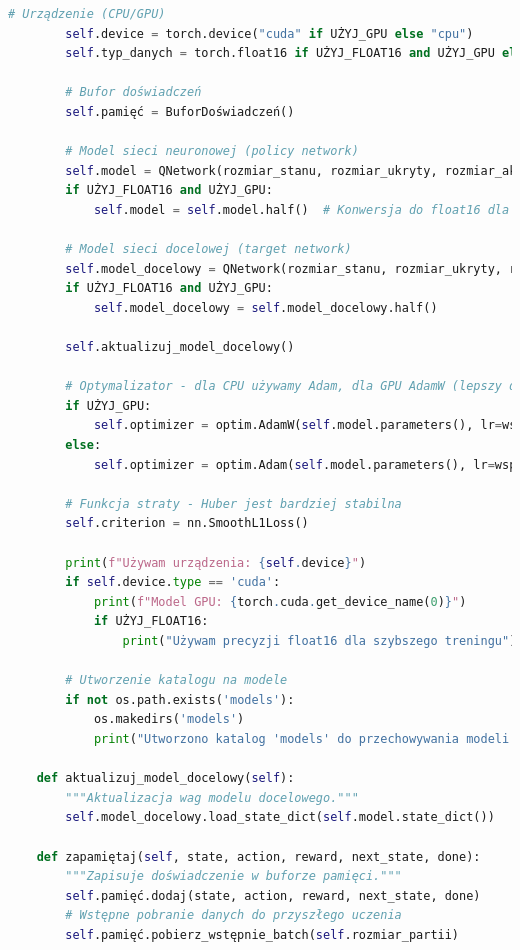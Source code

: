 \documentclass[a4paper,12pt]{article}
\begin{document}
\begin{lstlisting}[language=Python]
        # Urządzenie (CPU/GPU)
        self.device = torch.device("cuda" if UŻYJ_GPU else "cpu")
        self.typ_danych = torch.float16 if UŻYJ_FLOAT16 and UŻYJ_GPU else torch.float32
        
        # Bufor doświadczeń
        self.pamięć = BuforDoświadczeń()
        
        # Model sieci neuronowej (policy network)
        self.model = QNetwork(rozmiar_stanu, rozmiar_ukryty, rozmiar_akcji).to(self.device)
        if UŻYJ_FLOAT16 and UŻYJ_GPU:
            self.model = self.model.half()  # Konwersja do float16 dla GPU
        
        # Model sieci docelowej (target network)
        self.model_docelowy = QNetwork(rozmiar_stanu, rozmiar_ukryty, rozmiar_akcji).to(self.device)
        if UŻYJ_FLOAT16 and UŻYJ_GPU:
            self.model_docelowy = self.model_docelowy.half()
            
        self.aktualizuj_model_docelowy()
        
        # Optymalizator - dla CPU używamy Adam, dla GPU AdamW (lepszy dla GPU)
        if UŻYJ_GPU:
            self.optimizer = optim.AdamW(self.model.parameters(), lr=współczynnik_uczenia, weight_decay=1e-5)
        else:
            self.optimizer = optim.Adam(self.model.parameters(), lr=współczynnik_uczenia)
        
        # Funkcja straty - Huber jest bardziej stabilna
        self.criterion = nn.SmoothL1Loss()
        
        print(f"Używam urządzenia: {self.device}")
        if self.device.type == 'cuda':
            print(f"Model GPU: {torch.cuda.get_device_name(0)}")
            if UŻYJ_FLOAT16:
                print("Używam precyzji float16 dla szybszego treningu")
        
        # Utworzenie katalogu na modele
        if not os.path.exists('models'):
            os.makedirs('models')
            print("Utworzono katalog 'models' do przechowywania modeli.")
    
    def aktualizuj_model_docelowy(self):
        """Aktualizacja wag modelu docelowego."""
        self.model_docelowy.load_state_dict(self.model.state_dict())
    
    def zapamiętaj(self, state, action, reward, next_state, done):
        """Zapisuje doświadczenie w buforze pamięci."""
        self.pamięć.dodaj(state, action, reward, next_state, done)
        # Wstępne pobranie danych do przyszłego uczenia
        self.pamięć.pobierz_wstępnie_batch(self.rozmiar_partii)
    

\end{lstlisting}
\end{document}
